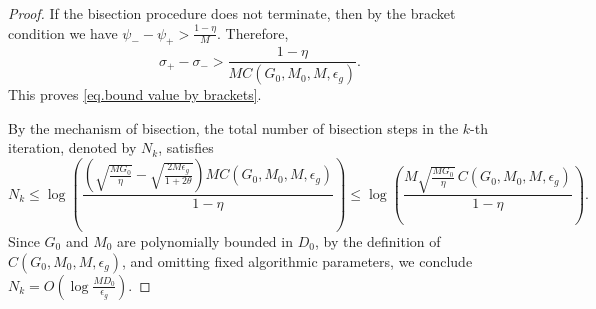 \documentclass{article}
\numberwithin{equation}{section}
\numberwithin{equation}{section}
\begin{document}
\begin{proof}
    If the bisection procedure does not terminate, then by the bracket condition
    we have
    \(
    \psi_- - \psi_+
    >
    \frac{1-\eta}{M}.
    \)
    Therefore,
    \[
        \sigma_+-\sigma_-
        >
        \frac{1-\eta}
        {M C(G_0,M_0,M,\epsilon_g)}.
    \]
    This proves \eqref{eq.bound value by brackets}.

    By the mechanism of bisection, the total number of bisection steps in the
    \(k\)-th iteration, denoted by \(N_k\), satisfies
    \[
        N_k
        \le
        \log\left(
        \frac{
                \left(
                \sqrt{\frac{MG_0}{\eta}}
                -
                \sqrt{\frac{2M\epsilon_g}{1+2\theta}}
                \right)
                M C(G_0,M_0,M,\epsilon_g)
            }{
                1-\eta
            }
        \right)
        \le
        \log\left(
        \frac{
                M\sqrt{\frac{MG_0}{\eta}}\,
                C(G_0,M_0,M,\epsilon_g)
            }{
                1-\eta
            }
        \right).
    \]
    Since \(G_0\) and \(M_0\) are polynomially bounded in \(D_0\), by the
    definition of \(C(G_0,M_0,M,\epsilon_g)\), and omitting fixed algorithmic
    parameters, we conclude
    \(
    N_k
    =
    O\left(
    \log\frac{MD_0}{\epsilon_g}
    \right).
    \)
\end{proof}
\end{document}
